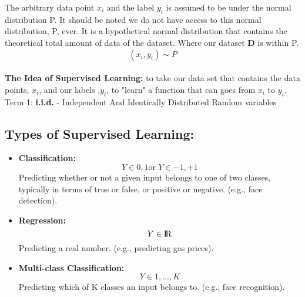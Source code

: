 \documentclass{article}
\begin{document}
    The arbitrary data point $x_{i}$ and the label $y_{i}$ is assumed to be under the normal distribution P. It should be noted we do not have access to this normal distribution, P, ever. It is a hypothetical normal distribution that contains the theoretical total amount of data of the dataset. Where our dataset $\textbf{D}$ is within P.
    \begin{equation}
        (x_{i}, y_{i}) \sim P
    \end{equation} \\
    
    \textbf{The Idea of Supervised Learning:} to take our data set that contains the data points, $x_{i}$, and our labels ,$y_{i}$, to "learn" a function that can goes from $x_{i}$ to $y_{i}$. \\
    
    Term 1: \textbf{i.i.d.} - Independent And Identically Distributed Random variables \\
    
    \subsection{Types of Supervised Learning:}
    \begin{itemize}
        \item 
            \textbf{Classification:} 
            \begin{equation}
                {Y \in {0, 1}} \text{or } {Y \in {-1, +1}}
            \end{equation}
            Predicting whether or not a given input belongs to one of two classes, typically in terms of true or false, or positive or negative. (e.g., face detection).
            
        \item
             \textbf{Regression:} 
            \begin{equation}
                {Y \in \rm I\!R}
            \end{equation}
            Predicting a real number. (e.g., predicting gas prices).
            
        \item
             \textbf{Multi-class Classification:} 
            \begin{equation}
                {Y \in {1, ..., K}}
            \end{equation}
            Predicting which of {K} classes an input belongs to. (e.g., face recognition). \\
    \end{itemize}
    
\end{document}
